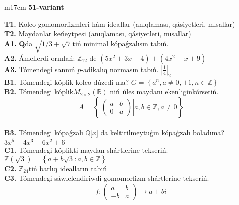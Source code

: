 \documentclass{article}
\begin{document}
\begin{tabular}{m{17cm}}
\textbf{51-variant}
\newline

\textbf{T1.} Kolco gomomorfizmleri hám ideallar (anıqlaması, qásiyetleri, mısallar) \\
\textbf{T2.} Maydanlar keńeytpesi (anıqlaması, qásiyetleri, mısallar) \\
\textbf{A1.} \(\mathbf{Q}\)da \(\sqrt{1/3 + \sqrt{7}}\)tiń minimal kópaǵzalısın tabıń. \\
\textbf{A2.} Ámellerdi orınlań: \(\mathbb{Z}_{12}\) de \(\left( 5x^{2} + 3x - 4 \right) + \left( 4x^{2} - x + 9 \right)\) \\
\textbf{A3.} Tómendegi sannıń \(p\)-adikalıq normasın tabıń. \(|\frac{1}{4}|_{2} =\) \\
\textbf{B1.} Tómendegi kóplik kolco dúzedi ma? \(G = \left\{ a^{n},a \neq 0, \pm 1,n \in \mathbb{Z} \right\}\) \\
\textbf{B2.} Tómendegi kóplik\(M_{2 \times 2}\left( \mathbb{R} \right)\) niń úles maydanı ekenliginkórsetiń.
\[A = \left\{ \left. \ \begin{pmatrix}
a & b \\
0 & a
\end{pmatrix} \right|a,b\mathbb{\in Z},a \neq 0 \right\}\] \\
\textbf{B3.} Tómendegi kópaǵzalı \(\mathbb{Q\lbrack}x\rbrack\) da keltirilmeytuǵın kópaǵzalı boladıma? \(3x^{5} - 4x^{3} - 6x^{2} + 6\) \\
\textbf{C1.} Tómendegi kóplikti maydan shártlerine tekseriń. \(\mathbb{Z}\left( \sqrt{3} \right) = \left\{ a + b\sqrt{3}:a,b \in \mathbb{Z} \right\}\) \\
\textbf{C2.} \(\mathbb{Z}_{24}\)tiń barlıq idealların tabıń \\
\textbf{C3.} Tómendegi sáwlelendiriwdi gomomorfizm shártlerine tekseriń.
\[f:\begin{pmatrix}
a & b \\
 - b & a
\end{pmatrix} \rightarrow a + bi\] \\

\end{tabular}
\vspace{1cm}
\end{document}
